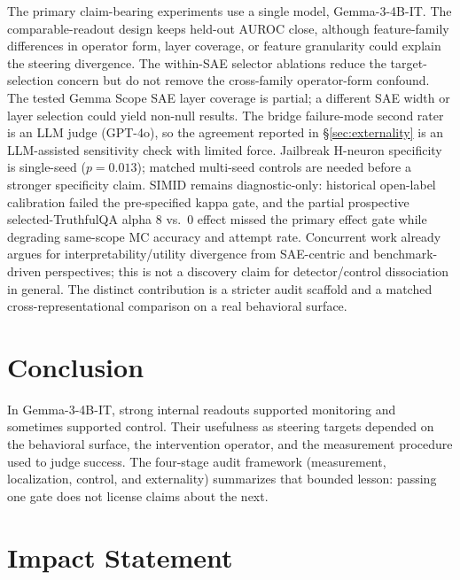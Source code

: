 \documentclass{article}
\begin{document}
The primary claim-bearing experiments use a single model, Gemma-3-4B-IT.
The comparable-readout design keeps held-out AUROC close, although feature-family differences in operator form, layer coverage, or feature granularity could explain the steering divergence.
The within-SAE selector ablations reduce the target-selection concern but do not remove the cross-family operator-form confound.
The tested Gemma Scope SAE layer coverage \citep{lieberum2024gemmascope} is partial; a different SAE width or layer selection could yield non-null results.
The bridge failure-mode second rater is an LLM judge (GPT-4o), so the agreement reported in \S\ref{sec:externality} is an LLM-assisted sensitivity check with limited force.
Jailbreak H-neuron specificity is single-seed ($p = 0.013$); matched multi-seed controls are needed before a stronger specificity claim.
SIMID remains diagnostic-only: historical open-label calibration failed the pre-specified kappa gate, and the partial prospective selected-TruthfulQA alpha 8 vs.\ 0 effect missed the primary effect gate while degrading same-scope MC accuracy and attempt rate.
Concurrent work \citep{wang2026interpretability,arad2025saes,wu2025axbench} already argues for interpretability/utility divergence from SAE-centric and benchmark-driven perspectives; this is not a discovery claim for detector/control dissociation in general.
The distinct contribution is a stricter audit scaffold and a matched cross-representational comparison on a real behavioral surface.

\section{Conclusion}

In Gemma-3-4B-IT, strong internal readouts supported monitoring and sometimes supported control.
Their usefulness as steering targets depended on the behavioral surface, the intervention operator, and the measurement procedure used to judge success.
The four-stage audit framework (measurement, localization, control, and externality) summarizes that bounded lesson: passing one gate does not license claims about the next.

\section*{Impact Statement}
\end{document}
